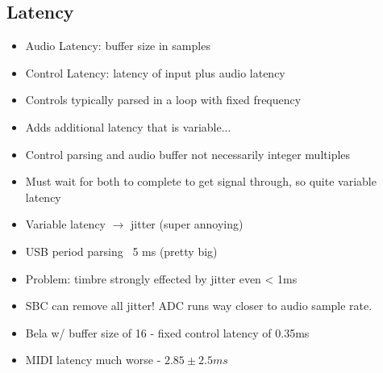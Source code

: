 \documentclass[12pt, letter]{article}
\begin{document}
\subsection*{Latency}
\begin{itemize}
	\item Audio Latency: buffer size in samples
	\item Control Latency: latency of input plus audio latency
	\item Controls typically parsed in a loop with fixed frequency
	\item Adds additional latency that is variable...
	\item Control parsing and audio buffer not necessarily integer multiples
	\item Must wait for both to complete to get signal through, so quite variable latency
	\item Variable latency $\to$ jitter (super annoying)
	\item USB period parsing ~5 ms (pretty big)
	\item Problem: timbre strongly effected by jitter even < 1ms
	\item \ac{SBC} can remove all jitter! \ac{ADC} runs way closer to audio sample rate.
	\item Bela w/ buffer size of 16 - fixed control latency of 0.35ms
	\item MIDI latency much worse - $2.85\pm 2.5ms$
\end{itemize}
\end{document}
